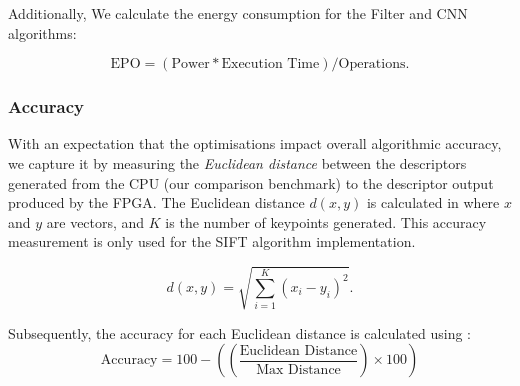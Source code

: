 Additionally, We calculate the energy consumption for the Filter and CNN algorithms:

\begin{equation}\label{eq:energy}
\text{EPO} = (\text{Power} * \text{Execution Time})/\text{Operations}.    
\end{equation}





\subsubsection{Accuracy}

With an expectation that the optimisations impact overall algorithmic accuracy, we capture it by measuring the \textit{Euclidean distance} between the descriptors generated from the CPU (our comparison benchmark) to the descriptor output produced by the FPGA. The Euclidean distance $d(x,y)$ is calculated in  where $x$ and $y$ are vectors, and $K$ is the number of keypoints generated. This accuracy measurement is only used for the SIFT algorithm implementation.

\begin{equation}\label{eq:Euc}
d(x,y)=\sqrt{\sum_{i=1}^{K} (x_{i}-y_{i})^{2}}.
\end{equation}

Subsequently, the accuracy for each Euclidean distance is calculated using :
\begin{equation}\label{eq:Accu}
\text{Accuracy} = 100 - \left( \left( \frac{\text{Euclidean Distance}}{\text{Max Distance}} \right) \times 100\right)
\end{equation}

